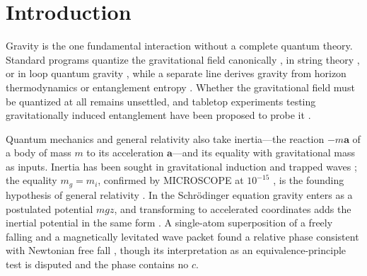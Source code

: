 \documentclass[aps,prd,onecolumn,tightenlines,nofootinbib,notitlepage,10pt,floatfix]{revtex4-2}
\theoremstyle{indentedtheorem}
\begin{document}
\maketitle

\section{Introduction}
\label{sec:intro}

Gravity is the one fundamental interaction without a complete quantum theory. Standard programs quantize the gravitational field canonically \citep{DeWitt1967Quantum}, in string theory \citep{Green1987Superstring,Polchinski1998String}, or in loop quantum gravity \citep{Ashtekar1986Variables,Rovelli2004Quantum}, while a separate line derives gravity from horizon thermodynamics or entanglement entropy \citep{Jacobson1995Thermodynamics,Padmanabhan2010Thermodynamics,Verlinde2011Origin,Jacobson2016Entanglement,Verlinde2017Emergent}. Whether the gravitational field must be quantized at all remains unsettled, and tabletop experiments testing gravitationally induced entanglement have been proposed to probe it \citep{Bose2017Spin,Marletto2017Gravitationally}.

Quantum mechanics and general relativity also take inertia---the reaction $-m\mathbf{a}$ of a body of mass $m$ to its acceleration $\mathbf{a}$---and its equality with gravitational mass as inputs. Inertia has been sought in gravitational induction \citep{Sciama1953Origin} and trapped waves \citep{Jennison1977Approach,Jennison1983Wave}; the equality $m_g=m_i$, confirmed by MICROSCOPE at $10^{-15}$ \citep{Touboul2017Microscope,Touboul2022Final}, is the founding hypothesis of general relativity \citep{Einstein1907Relativitatsprinzip}. In the Schr\"odinger equation gravity enters as a postulated potential $mgz$, and transforming to accelerated coordinates adds the inertial potential in the same form \citep{Shukla2010Gauge}. A single-atom superposition of a freely falling and a magnetically levitated wave packet found a relative phase consistent with Newtonian free fall \citep{Dobkowski2026Observation}, though its interpretation as an equivalence-principle test is disputed \citep{AsenbaumOverstreet2025Magnetic,Dobkowski2025Reply} and the phase contains no $c$.
\end{document}
